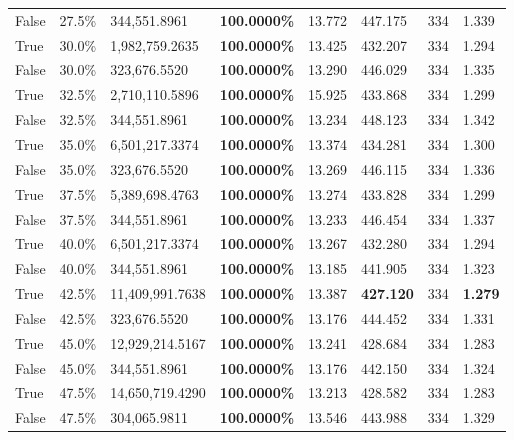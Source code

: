 \begin{table}[H]
\begin{tabular}{lllrllll}
\cline{1-8}
False & 27.5\% & 344,551.8961 & \bfseries \color{red} 100.0000\% & 13.772 & 447.175 & 334 & 1.339 \\
\cline{1-8}
True & 30.0\% & 1,982,759.2635 & \bfseries \color{red} 100.0000\% & 13.425 & 432.207 & 334 & 1.294 \\
\cline{1-8}
False & 30.0\% & 323,676.5520 & \bfseries \color{red} 100.0000\% & 13.290 & 446.029 & 334 & 1.335 \\
\cline{1-8}
True & 32.5\% & 2,710,110.5896 & \bfseries \color{red} 100.0000\% & 15.925 & 433.868 & 334 & 1.299 \\
\cline{1-8}
False & 32.5\% & 344,551.8961 & \bfseries \color{red} 100.0000\% & 13.234 & 448.123 & 334 & 1.342 \\
\cline{1-8}
True & 35.0\% & 6,501,217.3374 & \bfseries \color{red} 100.0000\% & 13.374 & 434.281 & 334 & 1.300 \\
\cline{1-8}
False & 35.0\% & 323,676.5520 & \bfseries \color{red} 100.0000\% & 13.269 & 446.115 & 334 & 1.336 \\
\cline{1-8}
True & 37.5\% & 5,389,698.4763 & \bfseries \color{red} 100.0000\% & 13.274 & 433.828 & 334 & 1.299 \\
\cline{1-8}
False & 37.5\% & 344,551.8961 & \bfseries \color{red} 100.0000\% & 13.233 & 446.454 & 334 & 1.337 \\
\cline{1-8}
True & 40.0\% & 6,501,217.3374 & \bfseries \color{red} 100.0000\% & 13.267 & 432.280 & 334 & 1.294 \\
\cline{1-8}
False & 40.0\% & 344,551.8961 & \bfseries \color{red} 100.0000\% & 13.185 & 441.905 & 334 & 1.323 \\
\cline{1-8}
True & 42.5\% & 11,409,991.7638 & \bfseries \color{red} 100.0000\% & 13.387 & \bfseries \color{red} 427.120 & 334 & \bfseries \color{red} 1.279 \\
\cline{1-8}
False & 42.5\% & 323,676.5520 & \bfseries \color{red} 100.0000\% & 13.176 & 444.452 & 334 & 1.331 \\
\cline{1-8}
True & 45.0\% & 12,929,214.5167 & \bfseries \color{red} 100.0000\% & 13.241 & 428.684 & 334 & 1.283 \\
\cline{1-8}
False & 45.0\% & 344,551.8961 & \bfseries \color{red} 100.0000\% & 13.176 & 442.150 & 334 & 1.324 \\
\cline{1-8}
True & 47.5\% & 14,650,719.4290 & \bfseries \color{red} 100.0000\% & 13.213 & 428.582 & 334 & 1.283 \\
\cline{1-8}
False & 47.5\% & 304,065.9811 & \bfseries \color{red} 100.0000\% & 13.546 & 443.988 & 334 & 1.329 \\

\end{tabular}
\end{table}

